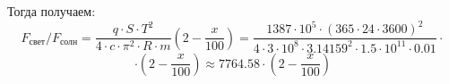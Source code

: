 Тогда получаем:
  $$F_{\text{свет}}/F_{\text{солн}} = \frac{q \cdot S \cdot T^2}{4 \cdot c \cdot \pi^2 \cdot R \cdot m} \left(2-\frac{x}{100}\right)=\frac{1387 \cdot 10^5 \cdot (365 \cdot 24 \cdot 3600)^2}{4 \cdot 3 \cdot 10^8 \cdot 3.14159^2 \cdot 1.5 \cdot 10^{11} \cdot 0.01} \cdot$$  
  $$\cdot \left(2-\frac{x}{100}\right) \approx 7764.58 \cdot (2-\frac{x}{100})$$

